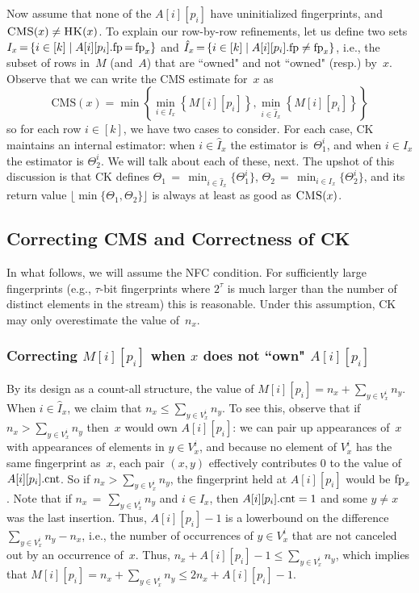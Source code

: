 Now assume that none of the $A[i][p_i]$ have uninitialized fingerprints, and $\textnormal{\textsc{CMS}}(x) \neq \textnormal{\textsc{HK}}(x)$. To explain our row-by-row refinements, let us define two sets  
$I_x\,{=}\,\{i \in [k] \;|\; A[i][p_i].\textup{fp}\,{=}\,\textup{fp}_x \}$ and $\hat{I}_x\,{=}\,\{i \in [k] \;|\; A[i][p_i].\textup{fp} \neq \textup{fp}_x \}$, 
i.e., the subset of rows in~$M$ (and~$A$) that are ``owned" and not ``owned" (resp.) by~$x$.  
Observe that we can write the CMS estimate for~$x$ as
\[
\mathrm{CMS}(x)
=\min \left\{    
\min_{i \in I_x}\left\{M[i][p_i]  \right\},
\min_{i \in \hat{I}_x}\left\{M[i][p_i]  \right\}
\right\}
\]
so for each row $i\in[k]$, we have two cases to consider.  For each case, CK maintains an internal estimator: when $i \in \hat{I}_x$ the estimator is~$\Theta^i_1$, and when $i \in I_x$ the estimator is $\Theta^i_2$.  We will talk about each of these, next. The upshot of this discussion is that CK defines $\Theta_1\,{=}\,\min_{i \in \hat{I}_x}\{\Theta^i_1\}$, $\Theta_2\,{=}\,\min_{i \in I_x}\{\Theta^i_2\}$, and its return value $\lfloor\min\{\Theta_1,\Theta_2\}\rfloor$ is always at least as good as $\textnormal{\textsc{CMS}}(x)$.  
 

\subsection{Correcting CMS and Correctness of CK}
In what follows, we will assume the NFC condition. For sufficiently large fingerprints (e.g., $\tau$-bit fingerprints where $2^\tau$ is much larger than the number of distinct elements in the stream) this is reasonable.  Under this assumption, CK may only overestimate the value of~$n_x$.

\subsubsection{Correcting ${M[i][p_i]}$ when ${x}$ does not ``own" ${A[i][p_i]}$}
By its design as a count-all structure, the value of $M[i][p_i]=n_x + \sum_{y \in V^i_x}n_y$.  When $i \in \hat{I}_x$, we claim that $n_x \leq \sum_{y \in V^i_x}n_y$.  To see this, observe that if $n_x > \sum_{y \in V^i_x}n_y$ then~$x$ would own $A[i][p_i]$: we can pair up appearances of~$x$ with appearances of elements in $y \in V^i_x$, and because no element of $V^i_x$ has the same fingerprint as~$x$, each pair $(x,y)$ effectively contributes 0 to the value of $A[i][p_i].\textup{cnt}$. So if $n_x > \sum_{y \in V^i_x}n_y$, the fingerprint held at $A[i][p_i]$ would be $\textup{fp}_x$.  Note that if $n_x\,{=}\,\sum_{y \in V^i_x}n_y$ and $i \in \hat{I}_x$, then $A[i][p_i].\textup{cnt}=1$ and some $y \neq x$ was the last insertion.  Thus, $A[i][p_i]-1$ is a lowerbound on the difference $\sum_{y \in V^i_x}n_y - n_x$, i.e., the number of occurrences of $y \in V^i_x$ that are not canceled out by an occurrence of~$x$.  Thus, $n_x + A[i][p_i]-1 \leq \sum_{y \in V^i_x}n_y$, which implies that $M[i][p_i]=n_x + \sum_{y \in V^i_x}n_y \leq 2n_x + A[i][p_i]-1$.
%

